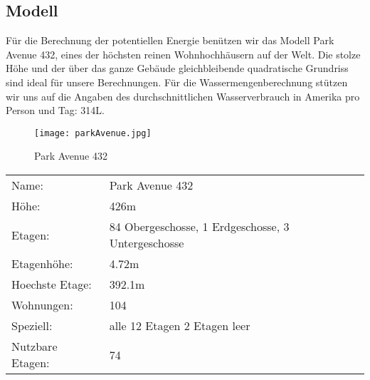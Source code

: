 \subsection{Modell} \label{subsec:modell}

Für die Berechnung der potentiellen Energie benützen wir das Modell Park Avenue 432, eines der höchsten reinen Wohnhochhäusern auf der Welt. Die stolze Höhe und der über das ganze Gebäude gleichbleibende quadratische Grundriss sind ideal für unsere Berechnungen. Für die Wassermengenberechnung stützen wir uns auf die Angaben des durchschnittlichen Wasserverbrauch in Amerika pro Person und Tag: 314\si{L}. \cite{waterUsAmerica}

\begin{figure} [H]
	\centering
	\texttt{[image: parkAvenue.jpg]}
	\caption{Park Avenue 432 \cite{432_Park_Avenue}}
	\label{fig:Park_Avenue_432}
\end{figure}

\begin{table}[H]
\centering
\begin{tabular}{ll}
Name:				&Park Avenue 432\\
Höhe: 				&426m\\          
Etagen:				&84 Obergeschosse, 1 Erdgeschosse, 3 Untergeschosse\\
Etagenhöhe:			&4.72m\\
Hoechste Etage:		&392.1m\\
Wohnungen:			&104\\
Speziell:			&alle 12 Etagen 2 Etagen leer\\    
Nutzbare Etagen: 	&74       
\end{tabular}
\end{table}

\newpage
